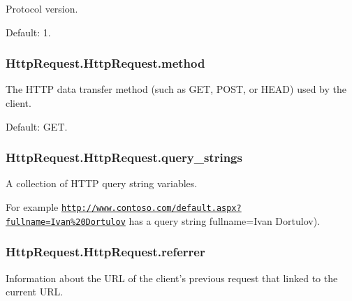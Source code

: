 Protocol version. 

Default\-: 1. \hypertarget{class_http_request_1_1_http_request_a2ef110e9c384476bc8b20d52b075911a}{
\subsubsection[{method}]{\setlength{\rightskip}{0pt plus 5cm}Http\-Request.\-Http\-Request.\-method}}\label{class_http_request_1_1_http_request_a2ef110e9c384476bc8b20d52b075911a}


The H\-T\-T\-P data transfer method (such as G\-E\-T, P\-O\-S\-T, or H\-E\-A\-D) used by the client. 

Default\-: G\-E\-T. \hypertarget{class_http_request_1_1_http_request_a1036f16b31416b249633c275ea53bfbf}{
\subsubsection[{query\-\_\-strings}]{\setlength{\rightskip}{0pt plus 5cm}Http\-Request.\-Http\-Request.\-query\-\_\-strings}}\label{class_http_request_1_1_http_request_a1036f16b31416b249633c275ea53bfbf}


A collection of H\-T\-T\-P query string variables. 

For example \href{http://www.contoso.com/default.aspx?fullname=Ivan%20Dortulov}{\tt http\-://www.\-contoso.\-com/default.\-aspx?fullname=\-Ivan\%20\-Dortulov} has a query string fullname=Ivan Dortulov). \hypertarget{class_http_request_1_1_http_request_a4b7fa1c7de17ba07e72d76318a91d620}{
\subsubsection[{referrer}]{\setlength{\rightskip}{0pt plus 5cm}Http\-Request.\-Http\-Request.\-referrer}}\label{class_http_request_1_1_http_request_a4b7fa1c7de17ba07e72d76318a91d620}


Information about the U\-R\-L of the client's previous request that linked to the current U\-R\-L. 

